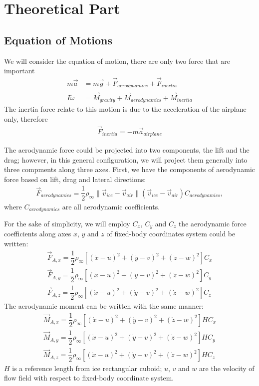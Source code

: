 \documentclass[a4paper, 12pt]{book}
\begin{document}
\chapter{Theoretical Part}

\section{Equation of Motions}

We will consider the equation of motion, there are only two force that are important
\begin{align}
    m \vec{a} &= m \vec{g} + \vec{F}_{aerodynamics} + \vec{F}_{inertia} \\
    I \ddot{\omega} &= \vec{M}_{gravity} + \vec{M}_{aerodynamics} + \vec{M}_{inertia}
\end{align}
The inertia force relate to this motion is due to the acceleration of the airplane only, therefore
\begin{align}
    \vec{F}_{inertia} = - m \vec{a}_{airplane}
\end{align}

The aerodynamic force could be projected into two components, the lift and the drag; however, in this general configuration, we will project them generally into  three compments along three axes. First, we have the components of aerodynamic force based on lift, drag and lateral directions:
\begin{align}
    \vec{F}_{aerodynamics} = \dfrac{1}{2} \rho_\infty \| \vec{v}_{ice} - \vec{v}_{air} \| (\vec{v}_{ice} - \vec{v}_{air}) C_{aerodynamics},
\end{align}
where $C_{aerodynamics}$ are all aerodynamic coefficients.

For the sake of simplicity, we will employ $C_x$, $C_y$ and $C_z$ the aerodynamic force coefficients along axes $x$, $y$ and $z$ of fixed-body coordinates system could be written:
\begin{align}
    \vec{F}_{A, x} = \dfrac{1}{2} \rho_\infty \left[ (\dot{x} - u)^2 + (\dot{y} - v)^2 + (\dot{z} - w)^2 \right] C_x \\
    \vec{F}_{A, y} = \dfrac{1}{2} \rho_\infty \left[ (\dot{x} - u)^2 + (\dot{y} - v)^2 + (\dot{z} - w)^2 \right] C_y \\
    \vec{F}_{A, z} = \dfrac{1}{2} \rho_\infty \left[ (\dot{x} - u)^2 + (\dot{y} - v)^2 + (\dot{z} - w)^2 \right] C_z
\end{align}
The aerodynamic moment can be written with the same manner:
\begin{align}
    \vec{M}_{A, x} = \dfrac{1}{2} \rho_\infty \left[ (\dot{x} - u)^2 + (\dot{y} - v)^2 + (\dot{z} - w)^2 \right] H C_x \\
    \vec{M}_{A, y} = \dfrac{1}{2} \rho_\infty \left[ (\dot{x} - u)^2 + (\dot{y} - v)^2 + (\dot{z} - w)^2 \right] H C_y \\
    \vec{M}_{A, z} = \dfrac{1}{2} \rho_\infty \left[ (\dot{x} - u)^2 + (\dot{y} - v)^2 + (\dot{z} - w)^2 \right] H C_z
\end{align}
$H$ is a reference length from ice rectangular cuboid; $u$, $v$ and $w$ are the velocity of flow field with respect to fixed-body coordinate system.
\end{document}
